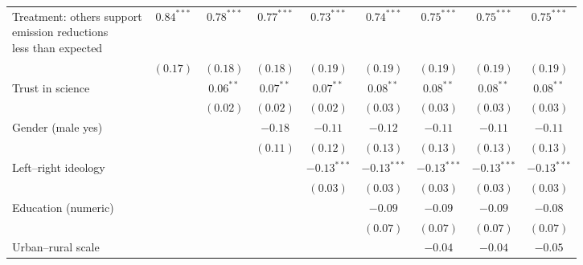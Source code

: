 \begin{table}[h]
\begin{center}
\begin{tabular}{l c c c c c c c c}
\shortstack{Treatment: others support\\emission reductions\\less than expected} & $0.84^{***}$  & $0.78^{***}$  & $0.77^{***}$  & $0.73^{***}$  & $0.74^{***}$  & $0.75^{***}$  & $0.75^{***}$  & $0.75^{***}$  \\
                                                                                & $(0.17)$      & $(0.18)$      & $(0.18)$      & $(0.19)$      & $(0.19)$      & $(0.19)$      & $(0.19)$      & $(0.19)$      \\
Trust in science                                                                &               & $0.06^{**}$   & $0.07^{**}$   & $0.07^{**}$   & $0.08^{**}$   & $0.08^{**}$   & $0.08^{**}$   & $0.08^{**}$   \\
                                                                                &               & $(0.02)$      & $(0.02)$      & $(0.02)$      & $(0.03)$      & $(0.03)$      & $(0.03)$      & $(0.03)$      \\
Gender (male yes)                                                               &               &               & $-0.18$       & $-0.11$       & $-0.12$       & $-0.11$       & $-0.11$       & $-0.11$       \\
                                                                                &               &               & $(0.11)$      & $(0.12)$      & $(0.13)$      & $(0.13)$      & $(0.13)$      & $(0.13)$      \\
Left–right ideology                                                             &               &               &               & $-0.13^{***}$ & $-0.13^{***}$ & $-0.13^{***}$ & $-0.13^{***}$ & $-0.13^{***}$ \\
                                                                                &               &               &               & $(0.03)$      & $(0.03)$      & $(0.03)$      & $(0.03)$      & $(0.03)$      \\
Education (numeric)                                                             &               &               &               &               & $-0.09$       & $-0.09$       & $-0.09$       & $-0.08$       \\
                                                                                &               &               &               &               & $(0.07)$      & $(0.07)$      & $(0.07)$      & $(0.07)$      \\
Urban–rural scale                                                               &               &               &               &               &               & $-0.04$       & $-0.04$       & $-0.05$       \\

\end{tabular}
\end{center}
\end{table}
